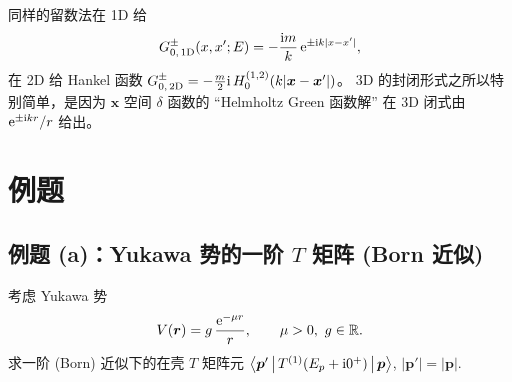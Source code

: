 \begin{remark}[1D 与 2D 的对比]
同样的留数法在 1D 给
\begin{equation}\label{eq:G-free-1d}
  G_{0,\,1\mathrm{D}}^\pm(x,x';E) = -\frac{\mathrm{i} m}{k}\,\mathrm{e}^{\pm\mathrm{i} k|x-x'|},
\end{equation}
在 2D 给 Hankel 函数
$G_{0,\,2\mathrm{D}}^\pm = -\frac{m}{2}\mathrm{i}\,H_0^{(1,2)}(k|\bm x-\bm x'|)$。
3D 的封闭形式之所以特别简单，是因为
$\bm x$ 空间 $\delta$ 函数的 ``Helmholtz Green 函数解'' 在 3D 闭式由
$\mathrm{e}^{\pm\mathrm{i} kr}/r$ 给出。
\end{remark}

\section{例题}\label{sec:G-examples}

\subsection{例题 (a)：Yukawa 势的一阶 $T$ 矩阵 (Born 近似)}

\begin{example}\label{ex:G-Yukawa}
考虑 Yukawa 势
\begin{equation}\label{eq:G-Yukawa-V}
  V(\bm r) = g\,\frac{\rme^{-\mu r}}{r},\qquad \mu>0,\ g\in\R.
\end{equation}
求一阶 (Born) 近似下的在壳 $T$ 矩阵元
$\left\langle \bm p' \,\middle|\, T^{(1)}(E_p+\mathrm{i} 0^+) \,\middle|\, \bm p \right\rangle$, $|\bm p'|=|\bm p|$.
\end{example}


